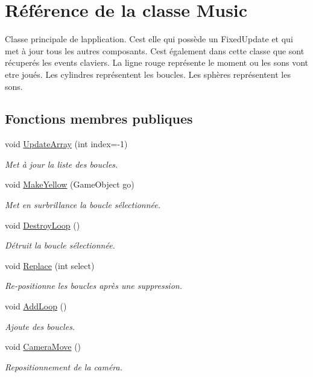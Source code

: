 \hypertarget{class_music}{}\section{Référence de la classe Music}
\label{class_music}


Classe principale de l\textquotesingle{}application. C\textquotesingle{}est elle qui possède un Fixed\+Update et qui met à jour tous les autres composants. C\textquotesingle{}est également dans cette classe que sont récuperés les events claviers. La ligne rouge représente le moment ou les sons vont etre joués. Les cylindres représentent les boucles. Les sphères représentent les sons.  


\subsection*{Fonctions membres publiques}
\begin{DoxyCompactItemize}
\item 
void \hyperlink{class_music_a25d6adb92e3f3b05b996537d467a29f2}{Update\+Array} (int index=-\/1)
\begin{DoxyCompactList}\small\item\em Met à jour la liste des boucles. \end{DoxyCompactList}\item 
void \hyperlink{class_music_a3c969affd4d6d160a668e5fe33bec756}{Make\+Yellow} (Game\+Object go)
\begin{DoxyCompactList}\small\item\em Met en surbrillance la boucle sélectionnée. \end{DoxyCompactList}\item 
void \hyperlink{class_music_a118396d7b9526c5111f3d8d0e1f55c0d}{Destroy\+Loop} ()
\begin{DoxyCompactList}\small\item\em Détruit la boucle sélectionnée. \end{DoxyCompactList}\item 
void \hyperlink{class_music_afcef8e50a31bccf2cb425cfa851322d5}{Replace} (int select)
\begin{DoxyCompactList}\small\item\em Re-\/positionne les boucles après une suppression. \end{DoxyCompactList}\item 
void \hyperlink{class_music_ab103b2b4b594c28a547c5c44c4736390}{Add\+Loop} ()
\begin{DoxyCompactList}\small\item\em Ajoute des boucles. \end{DoxyCompactList}\item 
void \hyperlink{class_music_aecc7789c2058cbd454e28abef95a5f7e}{Camera\+Move} ()
\begin{DoxyCompactList}\small\item\em Repositionnement de la caméra. \end{DoxyCompactList}\end{DoxyCompactItemize}
